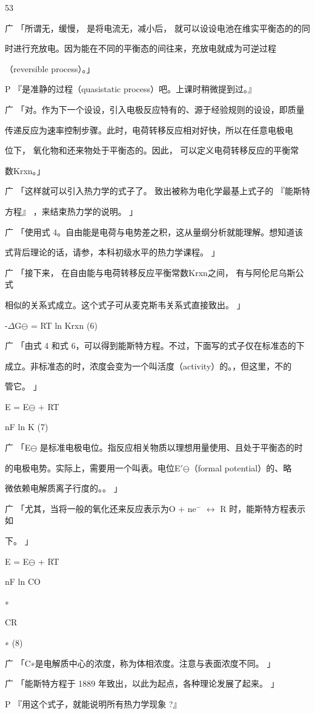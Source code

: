 53\par
广 「所谓无，缓慢， 是将电流无，减小后， 就可以设设电池在维实平衡态的的同\par
时进行充放电。因为能在不同的平衡态的间往来，充放电就成为可逆过程\par
（reversible process）。」\par
P 『是准静的过程（quasistatic process）吧。上课时稍微提到过。』\par
广 「对。作为下一个设设，引入电极反应特有的、源于经验规则的设设，即质量\par
传递反应为速率控制步骤。此时，电荷转移反应相对好快，所以在任意电极电\par
位下， 氧化物和还来物处于平衡态的。因此， 可以定义电荷转移反应的平衡常\par
数Krxn。」\par
广 「这样就可以引入热力学的式子了。 致出被称为电化学最基上式子的 『能斯特\par
方程』 ，来结束热力学的说明。 」\par
广 「使用式 4。自由能是电荷与电势差之积，这从量纲分析就能理解。想知道该\par
式背后理论的话，请参，本科初级水平的热力学课程。 」\par
广 「接下来， 在自由能与电荷转移反应平衡常数Krxn之间， 有与阿伦尼乌斯公式\par
相似的关系式成立。这个式子可从麦克斯韦关系式直接致出。 」\par
-$\Delta$G$\ominus$ = RT ln Krxn (6)\par
广 「由式 4 和式 6，可以得到能斯特方程。不过，下面写的式子仅在标准态的下\par
成立。非标准态的时，浓度会变为一个叫活度（activity）的。，但这里，不的\par
管它。 」\par
E = E$\ominus$ + RT\par
nF ln K (7)\par
广 「E$\ominus$ 是标准电极电位。指反应相关物质以理想用量使用、且处于平衡态的时\par
的电极电势。实际上，需要用一个叫表。电位E$\prime$$\ominus$（formal potential）的、略\par
微依赖电解质离子行度的。。 」\par
广 「尤其，当将一般的氧化还来反应表示为O + ne$^{-}$ $\leftrightarrow$ R 时，能斯特方程表示如\par
下。 」\par
E = E$\ominus$ + RT\par
nF ln CO\par
∗\par
CR\par
∗ (8)\par
广 「C∗是电解质中心的浓度，称为体相浓度。注意与表面浓度不同。 」\par
广 「能斯特方程于 1889 年致出，以此为起点，各种理论发展了起来。 」\par
P 『用这个式子，就能说明所有热力学现象 ?』\par

